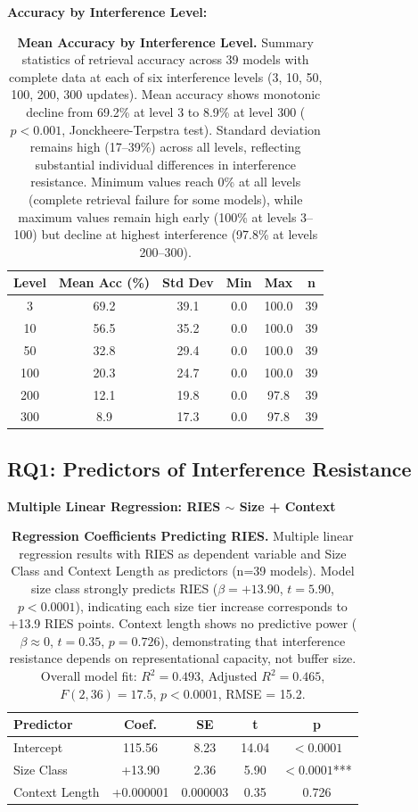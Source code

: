 \documentclass{article}
\begin{document}
\textbf{Accuracy by Interference Level:}

\begin{table}[t]
\centering
\caption{\textbf{Mean Accuracy by Interference Level.}
Summary statistics of retrieval accuracy across 39 models with complete data at each of six interference levels (3, 10, 50, 100, 200, 300 updates).
Mean accuracy shows monotonic decline from 69.2\% at level 3 to 8.9\% at level 300 ($p < 0.001$, Jonckheere-Terpstra test).
Standard deviation remains high (17--39\%) across all levels, reflecting substantial individual differences in interference resistance.
Minimum values reach 0\% at all levels (complete retrieval failure for some models), while maximum values remain high early (100\% at levels 3--100) but decline at highest interference (97.8\% at levels 200--300).}
\begin{tabular}{cccccc}
\toprule
Level & Mean Acc (\%) & Std Dev & Min & Max & n \\
\midrule
3 & 69.2 & 39.1 & 0.0 & 100.0 & 39 \\
10 & 56.5 & 35.2 & 0.0 & 100.0 & 39 \\
50 & 32.8 & 29.4 & 0.0 & 100.0 & 39 \\
100 & 20.3 & 24.7 & 0.0 & 100.0 & 39 \\
200 & 12.1 & 19.8 & 0.0 & 97.8 & 39 \\
300 & 8.9 & 17.3 & 0.0 & 97.8 & 39 \\
\bottomrule
\end{tabular}
\end{table}

\subsection{RQ1: Predictors of Interference Resistance}

\textbf{Multiple Linear Regression: RIES $\sim$ Size + Context}

\begin{table}[t]
\centering
\small
\caption{\textbf{Regression Coefficients Predicting RIES.}
Multiple linear regression results with RIES as dependent variable and Size Class and Context Length as predictors (n=39 models).
Model size class strongly predicts RIES ($\beta = +13.90$, $t = 5.90$, $p < 0.0001$), indicating each size tier increase corresponds to +13.9 RIES points.
Context length shows no predictive power ($\beta \approx 0$, $t = 0.35$, $p = 0.726$), demonstrating that interference resistance depends on representational capacity, not buffer size.
Overall model fit: $R^2 = 0.493$, Adjusted $R^2 = 0.465$, $F(2, 36) = 17.5$, $p < 0.0001$, RMSE = 15.2.}
\setlength{\tabcolsep}{4pt}
\begin{tabular}{@{}lcccc@{}}
\toprule
Predictor & Coef. & SE & t & p \\
\midrule
Intercept & 115.56 & 8.23 & 14.04 & $< 0.0001$ \\
Size Class & +13.90 & 2.36 & 5.90 & $< 0.0001$*** \\
Context Length & +0.000001 & 0.000003 & 0.35 & 0.726 \\
\bottomrule
\end{tabular}
\end{table}
\end{document}
